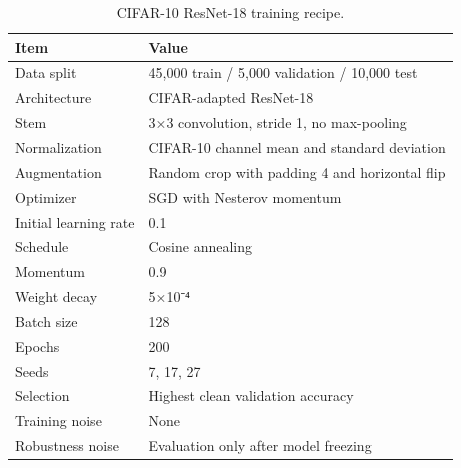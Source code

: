 \begin{table}
\caption{CIFAR-10 ResNet-18 training recipe.}
\label{tab:cifar_recipe}
\begin{tabular}{ll}
\toprule
Item & Value \\
\midrule
Data split & 45,000 train / 5,000 validation / 10,000 test \\
Architecture & CIFAR-adapted ResNet-18 \\
Stem & 3×3 convolution, stride 1, no max-pooling \\
Normalization & CIFAR-10 channel mean and standard deviation \\
Augmentation & Random crop with padding 4 and horizontal flip \\
Optimizer & SGD with Nesterov momentum \\
Initial learning rate & 0.1 \\
Schedule & Cosine annealing \\
Momentum & 0.9 \\
Weight decay & 5×10⁻⁴ \\
Batch size & 128 \\
Epochs & 200 \\
Seeds & 7, 17, 27 \\
Selection & Highest clean validation accuracy \\
Training noise & None \\
Robustness noise & Evaluation only after model freezing \\
\bottomrule
\end{tabular}
\end{table}
